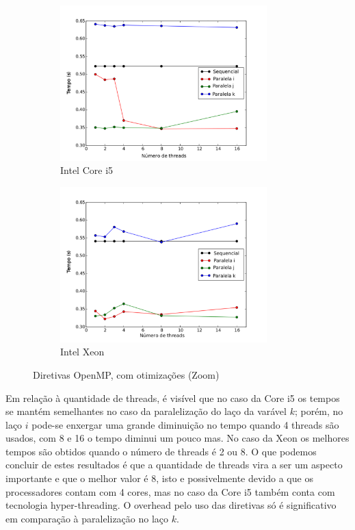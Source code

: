 \documentclass[a4paper,12pt,fleqn]{article}
\begin{document}
\begin{figure} 
    \centering
    \begin{subfigure}{.5\textwidth}
        \centering
        \includegraphics[height=6cm]{Images/corei5cozoom} 
        \caption{Intel Core i5}
        \label{fig:corei5cozoom} 
    \end{subfigure}%
    \begin{subfigure}{.5\textwidth}
        \centering
        \includegraphics[height=6cm]{Images/xeoncozoom} 
        \caption{Intel Xeon}
        \label{fig:xeoncozoom} 
    \end{subfigure}    
    \caption{Diretivas OpenMP, com otimizações (Zoom)}
    \label{fig:cozoom}
\end{figure} 

Em relação à quantidade de threads, é visível que no caso da Core i5 os tempos se mantém semelhantes no caso da paralelização do laço da varável $k$; porém, no laço $i$ pode-se enxergar uma grande diminuição no tempo quando 4 threads são usados, com 8 e 16 o tempo diminui um pouco mas. No caso da Xeon os melhores tempos são obtidos quando o número de threads é 2 ou 8. O que podemos concluir de estes resultados é que a quantidade de threads vira a ser um aspecto importante e que o melhor valor é 8, isto e possivelmente devido a que os processadores contam com 4 cores, mas no caso da Core i5  também conta com tecnologia hyper-threading. O overhead pelo uso das diretivas só é significativo em comparação à paralelização no laço $k$.
\end{document}
